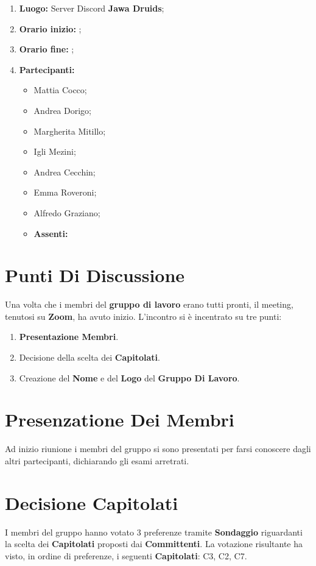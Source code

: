 \documentclass[a4paper,12pt]{report}
\begin{document}
	\makeatother	
	\newpage
	\begin{enumerate}
		\item \textbf{Luogo:} \normalfont Server Discord \textbf{Jawa Druids};
		\item \textbf{Orario inizio:} ;
		\item \textbf{Orario fine:} ;
		\item \textbf{Partecipanti:}
		\begin{itemize}
			\item Mattia Cocco;
			\item Andrea Dorigo;
			\item Margherita Mitillo;
			\item Igli Mezini;
			\item Andrea Cecchin;
			\item Emma Roveroni;
			\item Alfredo Graziano;
		\end{itemize}
		\begin{itemize}
			\item \textbf{Assenti:}
		\end{itemize}
	\end{enumerate}
	\newpage
	\tableofcontents{}
	\chapter{Punti Di Discussione}
	Una volta che i membri del \textbf{gruppo di lavoro} erano tutti pronti, il meeting, tenutosi su \textbf{Zoom}, ha avuto inizio.
	L'incontro si è incentrato su tre punti:
	\begin{enumerate}
		\item \textbf{Presentazione Membri}.		
		\item Decisione della scelta dei \textbf{Capitolati}.
		\item Creazione del \textbf{Nome} e del \textbf{Logo} del \textbf{Gruppo Di Lavoro}.
	\end{enumerate}

	\chapter{Presenzatione Dei Membri}
	Ad inizio riunione i membri del gruppo si sono presentati per farsi conoscere dagli altri partecipanti, dichiarando gli esami arretrati.
	
	\chapter{Decisione Capitolati}
	I membri del gruppo hanno votato 3 preferenze tramite \textbf{Sondaggio} riguardanti la scelta dei \textbf{Capitolati} proposti dai \textbf{Committenti}.
	La votazione risultante ha visto, in ordine di preferenze, i seguenti \textbf{Capitolati}: C3, C2, C7.
	 
\end{document}
